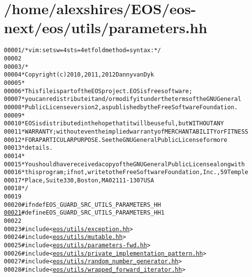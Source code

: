 \hypertarget{parameters_8hh_source}{
\section{/home/alexshires/EOS/eos-\/next/eos/utils/parameters.hh}
}


\begin{footnotesize}\begin{alltt}
00001 \textcolor{comment}{/* vim: set sw=4 sts=4 et foldmethod=syntax : */}
00002 
00003 \textcolor{comment}{/*}
00004 \textcolor{comment}{ * Copyright (c) 2010, 2011, 2012 Danny van Dyk}
00005 \textcolor{comment}{ *}
00006 \textcolor{comment}{ * This file is part of the EOS project. EOS is free software;}
00007 \textcolor{comment}{ * you can redistribute it and/or modify it under the terms of the GNU General}
00008 \textcolor{comment}{ * Public License version 2, as published by the Free Software Foundation.}
00009 \textcolor{comment}{ *}
00010 \textcolor{comment}{ * EOS is distributed in the hope that it will be useful, but WITHOUT ANY}
00011 \textcolor{comment}{ * WARRANTY; without even the implied warranty of MERCHANTABILITY or FITNESS}
00012 \textcolor{comment}{ * FOR A PARTICULAR PURPOSE.  See the GNU General Public License for more}
00013 \textcolor{comment}{ * details.}
00014 \textcolor{comment}{ *}
00015 \textcolor{comment}{ * You should have received a copy of the GNU General Public License along with}
00016 \textcolor{comment}{ * this program; if not, write to the Free Software Foundation, Inc., 59 Temple}
00017 \textcolor{comment}{ * Place, Suite 330, Boston, MA  02111-1307  USA}
00018 \textcolor{comment}{ */}
00019 
00020 \textcolor{preprocessor}{#ifndef EOS\_GUARD\_SRC\_UTILS\_PARAMETERS\_HH}
\hypertarget{parameters_8hh_source_l00021}{}\hyperlink{parameters_8hh_a59b39df17f16760b49fb66b7dd5bee9c}{00021} \textcolor{preprocessor}{}\textcolor{preprocessor}{#define EOS\_GUARD\_SRC\_UTILS\_PARAMETERS\_HH 1}
00022 \textcolor{preprocessor}{}
00023 \textcolor{preprocessor}{#include <\hyperlink{exception_8hh}{eos/utils/exception.hh}>}
00024 \textcolor{preprocessor}{#include <\hyperlink{mutable_8hh}{eos/utils/mutable.hh}>}
00025 \textcolor{preprocessor}{#include <\hyperlink{parameters-fwd_8hh}{eos/utils/parameters-fwd.hh}>}
00026 \textcolor{preprocessor}{#include <\hyperlink{private__implementation__pattern_8hh}{eos/utils/private_implementation_pattern.hh}>}
00027 \textcolor{preprocessor}{#include <\hyperlink{random__number__generator_8hh}{eos/utils/random_number_generator.hh}>}
00028 \textcolor{preprocessor}{#include <\hyperlink{wrapped__forward__iterator_8hh}{eos/utils/wrapped_forward_iterator.hh}>}

\end{alltt}
\end{footnotesize}

